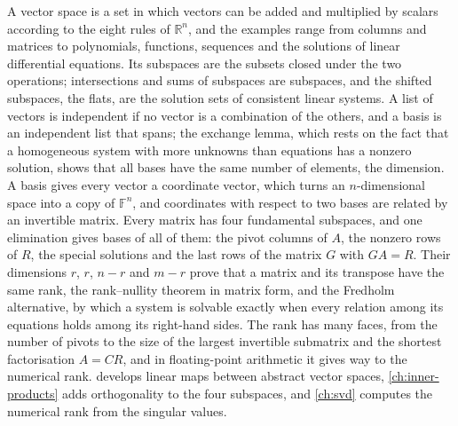 \bigskip
A vector space is a set in which vectors can be added and multiplied by scalars according to the eight rules of $\mathbb R^n$, and the examples range from columns and matrices to polynomials, functions, sequences and the solutions of linear differential equations. Its subspaces are the subsets closed under the two operations; intersections and sums of subspaces are subspaces, and the shifted subspaces, the flats, are the solution sets of consistent linear systems. A list of vectors is independent if no vector is a combination of the others, and a basis is an independent list that spans; the exchange lemma, which rests on the fact that a homogeneous system with more unknowns than equations has a nonzero solution, shows that all bases have the same number of elements, the dimension. A basis gives every vector a coordinate vector, which turns an $n$-dimensional space into a copy of $\mathbb F^n$, and coordinates with respect to two bases are related by an invertible matrix. Every matrix has four fundamental subspaces, and one elimination gives bases of all of them: the pivot columns of $A$, the nonzero rows of $R$, the special solutions and the last rows of the matrix $G$ with $GA=R$. Their dimensions $r$, $r$, $n-r$ and $m-r$ prove that a matrix and its transpose have the same rank, the rank--nullity theorem in matrix form, and the Fredholm alternative, by which a system is solvable exactly when every relation among its equations holds among its right-hand sides. The rank has many faces, from the number of pivots to the size of the largest invertible submatrix and the shortest factorisation $A=CR$, and in floating-point arithmetic it gives way to the numerical rank.  develops linear maps between abstract vector spaces, \cref{ch:inner-products} adds orthogonality to the four subspaces, and \cref{ch:svd} computes the numerical rank from the singular values.

\chapternotes

